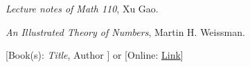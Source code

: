 \documentclass[11pt]{article}
\theoremstyle{plain}
\theoremstyle{definition}
\theoremstyle{remark}
\numberwithin{equation}{problem}
\begin{document}
\begin{thebibliography}{9}  %

\emph{Lecture notes of Math 110}, Xu Gao.

\emph{An Illustrated Theory of Numbers}, Martin H. Weissman.

[Book(s): \emph{Title}, Author ] or [Online: \href{http://example.com/}{Link}]
\end{thebibliography}  %
\end{document}

